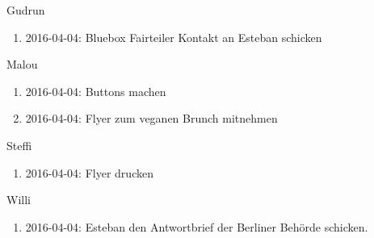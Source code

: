 \documentclass{scrreprt}
\begin{document}
Gudrun
\begin{enumerate}
	\item 2016-04-04: Bluebox Fairteiler Kontakt an Esteban schicken 
\end{enumerate}
Malou
\begin{enumerate}
    \item 2016-04-04: Buttons machen
    \item 2016-04-04: Flyer zum veganen Brunch mitnehmen
\end{enumerate}
Steffi
\begin{enumerate}
	\item 2016-04-04: Flyer drucken
\end{enumerate}
Willi
\begin{enumerate}
	\item 2016-04-04: Esteban den Antwortbrief der Berliner Behörde schicken.
\end{enumerate}
    
\end{document}
